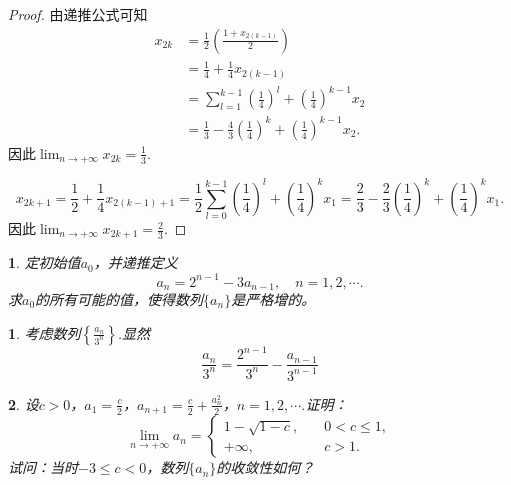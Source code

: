 \documentclass[utf8]{book}
\newtheorem{example}{}[section]             %
\newtheorem{solution}{}
\begin{document}
\begin{proof}
由递推公式可知
\begin{equation*}
\begin{split}
x_{2k} &= \frac{1}{2}\left(\frac{1+x_{2(k-1)}}{2}\right)\\&=\frac{1}{4}+\frac{1}{4}x_{2(k-1)}\\&= \displaystyle\sum_{l=1}^{k-1}\left(\frac{1}{4}\right)^l+\left(\frac{1}{4}\right)^{k-1}x_2 \\&= \frac{1}{3}-\frac{4}{3}\left(\frac{1}{4}\right)^k+\left(\frac{1}{4}\right)^{k-1}x_2.
\end{split}
\end{equation*}
因此$\displaystyle\lim_{n\to +\infty}x_{2k}=\frac{1}{3}$.

$$x_{2k+1}=\frac{1}{2}+\frac{1}{4}x_{2(k-1)+1}
=\frac{1}{2}\displaystyle\sum_{l=0}^{k-1}\left(\frac{1}{4}\right)^{l} + \left(\frac{1}{4}\right)^{k}x_1
=\frac{2}{3}-\frac{2}{3}\left(\frac{1}{4}\right)^{k}+\left(\frac{1}{4}\right)^{k}x_1.$$
因此$\displaystyle\lim_{n\to +\infty}x_{2k+1}=\frac{2}{3}$.
\end{proof}
\begin{example}
定初始值$a_0$，并递推定义$$a_n=2^{n-1}-3a_{n-1},\quad n=1,2,\cdots.$$
求$a_0$的所有可能的值，使得数列$\{a_n\}$是严格增的。
\end{example}
\begin{solution}
考虑数列$\left\{\displaystyle\frac{a_{n}}{3^{n}}\right\}$.显然
$$\frac{a_n}{3^n} = \frac{2^{n-1}}{3^n}-\frac{a_{n-1}}{3^{n-1}}$$
\end{solution}
\begin{example}
设$c>0$，$a_1=\frac{c}{2}$，$a_{n+1} = \frac{c}{2}+\frac{a_n^2}{2}$，$n=1,2,\cdots$.证明：
\begin{equation*}
\displaystyle\lim_{n\to +\infty}a_n=
\begin{cases}
1-\sqrt{1-c}, \quad &0<c\leq 1,\\
+\infty,\quad &c >1.
\end{cases}
\end{equation*}
试问：当时$-3\leq c < 0$，数列$\{a_n\}$的收敛性如何？
\end{example}
\end{document}
